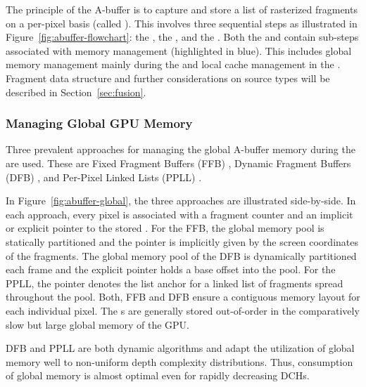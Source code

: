 \documentclass{egpubl}
\newcommand{\todo}[1]{{\color{red}\emph{(#1)}}}
\newcommand{\ab}{\mbox{A-buffer}}
\newcommand{\dch}{DCH}
\begin{document}

The principle of the \ab{} is to capture and store a list of rasterized fragments on a per-pixel basis (called \emph{\bFraglist}). 
This involves three sequential steps as illustrated in Figure~\ref{fig:abuffer-flowchart}: the \sClear, the \sFill, and the \sResolve. 
Both the \sFill{} and \sResolve{} contain sub-steps associated with memory management (highlighted in blue). 
This includes global memory management mainly during the \sFill{} and local cache management in the \sResolve.
Fragment data structure and further considerations on source types will be described in Section~\ref{sec:fusion}.





\subsubsection*{Managing Global GPU Memory}

Three prevalent approaches for managing the global \ab{} memory during the \sFill{} are used.
These are Fixed Fragment Buffers (FFB) \cite{Crassin2010}, Dynamic Fragment Buffers (DFB) \cite{Maule2012}, and Per-Pixel Linked Lists (PPLL) \cite{kainz2009ray,Yang2010,Crassin2010}. 

In Figure~\ref{fig:abuffer-global}, the three approaches are illustrated side-by-side.  
In each approach, every pixel is associated with a fragment counter and an implicit or explicit pointer to the stored \bFraglist. 
For the FFB, the global memory pool is statically partitioned and the pointer is implicitly given by the screen coordinates of the fragments. 
The global memory pool of the DFB is dynamically partitioned each frame and the explicit pointer holds a base offset into the pool. 
For the PPLL, the pointer denotes the list anchor for a linked list of fragments spread throughout the pool. 
Both, FFB and DFB ensure a contiguous memory layout for each individual pixel. 
The \bFraglist s are generally stored out-of-order in the comparatively slow but large global memory of the GPU.

DFB and PPLL are both dynamic algorithms and adapt the utilization of global memory well to non-uniform depth complexity distributions. 
Thus, consumption of global memory is almost optimal even for rapidly decreasing \dch{}s. 
\end{document}
